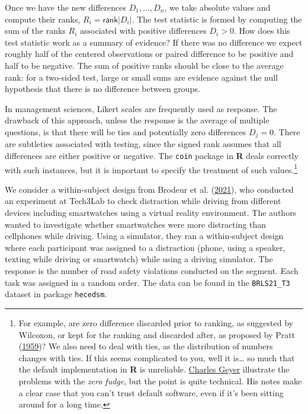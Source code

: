 \documentclass[
  11pt,
  letterpaper,
]{scrbook}
\theoremstyle{definition}
\theoremstyle{remark}
\begin{document}
Once we have the new differences \(D_1, \ldots, D_n\), we take absolute
values and compute their ranks, \(R_i = \mathsf{rank}|D_i|\). The test
statistic is formed by computing the sum of the ranks \(R_i\) associated
with positive differences \(D_i>0\). How does this test statistic work
as a summary of evidence? If there was no difference we expect roughly
half of the centered observations or paired difference to be positive
and half to be negative. The sum of positive ranks should be close to
the average rank: for a two-sided test, large or small sums are evidence
against the null hypothesis that there is no difference between groups.

In management sciences, Likert scales are frequently used as response.
The drawback of this approach, unless the response is the average of
multiple questions, is that there will be ties and potentially zero
differences \(D_j=0\). There are subtleties associated with testing,
since the signed rank assumes that all differences are either positive
or negative. The \texttt{coin} package in \textbf{R} deals correctly
with such instances, but it is important to specify the treatment of
such values.\footnote{For example, are zero difference discarded prior
  to ranking, as suggested by Wilcoxon, or kept for the ranking and
  discarded after, as proposed by Pratt
  (\protect\hyperlink{ref-Pratt:1959}{1959})? We also need to deal with
  ties, as the distribution of numbers changes with ties. If this seems
  complicated to you, well it is\ldots{} so much that the default
  implementation in \textbf{R} is unreliable.
  \href{https://www.stat.umn.edu/geyer/5601/examp/signrank.html}{Charles
  Geyer} illustrate the problems with the \emph{zero fudge}, but the
  point is quite technical. His notes make a clear case that you can't
  trust default software, even if it's been sitting around for a long
  time.}

We consider a within-subject design from Brodeur et al.
(\protect\hyperlink{ref-Brodeur:2021}{2021}), who conducted an
experiment at Tech3Lab to check distraction while driving from different
devices including smartwatches using a virtual reality environment. The
authors wanted to investigate whether smartwatches were more distracting
than cellphones while driving. Using a simulator, they ran a
within-subject design where each participant was assigned to a
distraction (phone, using a speaker, texting while driving or
smartwatch) while using a driving simulator. The response is the number
of road safety violations conducted on the segment. Each task was
assigned in a random order. The data can be found in the
\texttt{BRLS21\_T3} dataset in package \texttt{hecedsm}.
\end{document}
